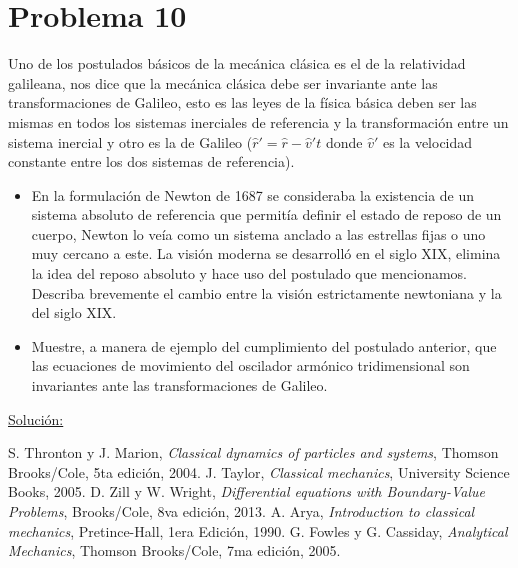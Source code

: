 \documentclass[a4paper,10pt]{article}
\numberwithin{equation}{section}
\begin{document}
\vspace{.3cm}

\section{Problema 10}

Uno de los postulados básicos de la mecánica clásica es el de la relatividad galileana,
nos dice que la mecánica clásica debe ser invariante ante las transformaciones de Galileo, 
esto es las leyes de la física básica deben ser las mismas en todos los sistemas inerciales
de referencia y la transformación entre un sistema inercial y otro es la de Galileo 
($\hat{r}' = \hat{r} - \hat{v}'t$ donde $\hat{v}'$ es la velocidad constante entre los dos 
sistemas de referencia).

\begin{itemize}
 \item En la formulación de Newton de 1687 se consideraba la existencia de un sistema 
 absoluto de referencia que permitía definir el estado de reposo de un cuerpo, Newton lo
 veía como un sistema anclado a las estrellas fijas o uno muy cercano a este. La visión 
 moderna se desarrolló en el siglo XIX, elimina la idea del reposo absoluto y hace 
 uso del postulado que mencionamos. Describa brevemente el cambio entre la visión 
 estrictamente newtoniana y la del siglo XIX.
 \item Muestre, a manera de ejemplo del cumplimiento del postulado anterior, que las 
 ecuaciones de movimiento del oscilador armónico tridimensional son invariantes ante
 las transformaciones de Galileo.
\end{itemize}

\vspace{.3cm}

\underline{Solución:}

\vspace{.3cm}

\begin{thebibliography}{10}
 S. Thronton y J. Marion, \textit{Classical dynamics of particles and systems}, Thomson Brooks/Cole,
 5ta edición, 2004.
 J. Taylor, \textit{Classical mechanics}, University Science Books, 2005.
 D. Zill y W. Wright, \textit{Differential equations with Boundary-Value Problems}, Brooks/Cole,
 8va edición, 2013.
 A. Arya, \textit{Introduction to classical mechanics}, Pretince-Hall, 1era Edición,
 1990.
 G. Fowles y G. Cassiday, \emph{Analytical Mechanics}, Thomson Brooks/Cole, 
 7ma edición, 2005.
\end{thebibliography}
\end{document}
